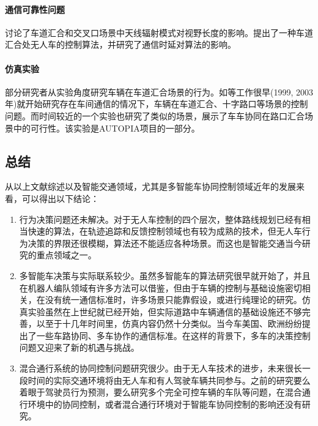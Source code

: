     \paragraph{通信可靠性问题}
    \cite{Abbas2013Radio}讨论了车道汇合和交叉口场景中天线辐射模式对视野长度的影响。\cite{Uno1999A}提出了一种车道汇合处无人车的控制算法，并研究了通信时延对算法的影响。
    \paragraph{仿真实验}
    部分研究者从实验角度研究车辆在车道汇合场景的行为。如\cite{Sakaguchi1999Inter,Kolodko2003Cooperative}等工作很早(1999, 2003年)就开始研究存在车间通信的情况下，车辆在车道汇合、十字路口等场景的控制问题。而时间较近的一个实验\cite{Milanes2011Automated}也研究了类似的场景，展示了车车协同在路口汇合场景中的可行性。该实验是AUTOPIA\cite{Milan2011AUTOPIA}项目的一部分。

  \subsection{总结}
  从以上文献综述以及智能交通领域，尤其是多智能车协同控制领域近年的发展来看，可以得出以下结论：

  \begin{enumerate}[label=(\arabic*)]
  \item 行为决策问题还未解决。对于无人车控制的四个层次，整体路线规划已经有相当快速的算法，在轨迹追踪和反馈控制领域也有较为成熟的技术，但无人车行为决策的界限还很模糊，算法还不能适应各种场景。而这也是智能交通当今研究的重点领域之一。
  \item 多智能车决策与实际联系较少。虽然多智能车的算法研究很早就开始了，并且在机器人编队领域有许多方法可以借鉴，但由于车辆的控制与基础设施密切相关，在没有统一通信标准时，许多场景只能靠假设，或进行纯理论的研究。仿真实验虽然在上世纪就已经开始，但实际道路中车辆通信的基础设施还不够完善，以至于十几年时间里，仿真内容仍然十分类似。当今车美国、欧洲纷纷提出了一些车路协同、多车协作的通信标准\cite{Chen2014Cooperative}。在这样的背景下，多车的决策控制问题又迎来了新的机遇与挑战。
  \item 混合通行系统的协同控制问题研究很少。由于无人车技术的进步，未来很长一段时间的实际交通环境将由无人车和有人驾驶车辆共同参与。之前的研究要么着眼于驾驶员行为预测，要么研究多个完全可控车辆的车队等问题，在混合通行环境中的协同控制，或者混合通行环境对于智能车协同控制的影响还没有研究。
  \end{enumerate}